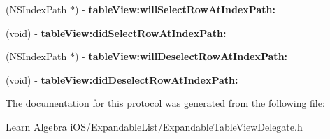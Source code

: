 \begin{DoxyCompactItemize}
\item 
\hypertarget{protocol_expandable_table_view_delegate-p_aff745e3e782ab7ab657bff84512789ca}{(N\-S\-Index\-Path $\ast$) -\/ {\bfseries table\-View\-:will\-Select\-Row\-At\-Index\-Path\-:}}\label{protocol_expandable_table_view_delegate-p_aff745e3e782ab7ab657bff84512789ca}

\item 
\hypertarget{protocol_expandable_table_view_delegate-p_ac6b4983a3570bbd1f8bcf981738800ce}{(void) -\/ {\bfseries table\-View\-:did\-Select\-Row\-At\-Index\-Path\-:}}\label{protocol_expandable_table_view_delegate-p_ac6b4983a3570bbd1f8bcf981738800ce}

\item 
\hypertarget{protocol_expandable_table_view_delegate-p_a7bcdbfd0efd66d671fe2e1e5b39a0fb7}{(N\-S\-Index\-Path $\ast$) -\/ {\bfseries table\-View\-:will\-Deselect\-Row\-At\-Index\-Path\-:}}\label{protocol_expandable_table_view_delegate-p_a7bcdbfd0efd66d671fe2e1e5b39a0fb7}

\item 
\hypertarget{protocol_expandable_table_view_delegate-p_a68ca66ad239634c9bef1e27f9f918b80}{(void) -\/ {\bfseries table\-View\-:did\-Deselect\-Row\-At\-Index\-Path\-:}}\label{protocol_expandable_table_view_delegate-p_a68ca66ad239634c9bef1e27f9f918b80}

\end{DoxyCompactItemize}


The documentation for this protocol was generated from the following file\-:\begin{DoxyCompactItemize}
\item 
Learn Algebra i\-O\-S/\-Expandable\-List/Expandable\-Table\-View\-Delegate.\-h\end{DoxyCompactItemize}
